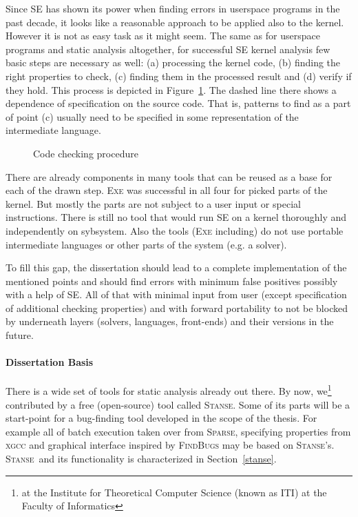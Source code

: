 \documentclass[11pt,a4paper]{article}
\newcommand{\stan}{\textsc{Stanse}}
\begin{document}
Since SE has shown its power when finding errors in userspace programs in the
past decade, it looks like a reasonable approach to be applied also to the
kernel. However it is not as easy task as it might seem. The same as for
userspace programs and static analysis altogether, for successful SE kernel
analysis few basic steps are necessary as well: (a) processing the kernel
code, (b) finding the right properties to check, (c) finding them in the
processed result and (d) verify if they hold. This process is depicted in
Figure~\ref{fig_code_process}. The dashed line there shows a dependence of
specification on the source code. That is, patterns to find as a part of
point (c) usually need to be specified in some representation of the
intermediate language.

\begin{figure}[htb]
\begin{center}

\caption{Code checking procedure}
\label{fig_code_process}
\end{center}
\end{figure}

There are already components in many tools that can be reused as a base for
each of the drawn step. \textsc{Exe} was successful in all four for picked
parts of the kernel. But mostly the parts are not subject to a user input or
special instructions. There is still no tool that would run SE on a kernel
thoroughly and independently on sybsystem. Also the tools (\textsc{Exe}
including) do not use portable intermediate languages or other parts of the
system (e.g. a solver).

To fill this gap, the dissertation should lead to a complete implementation
of the mentioned points and should find errors with minimum false positives
possibly with a help of SE. All of that with minimal input from user (except
specification of additional checking properties) and with forward portability
to not be blocked by underneath layers (solvers, languages, front-ends) and
their versions in the future.

\paragraph{Dissertation Basis} There is a wide set of tools for static
analysis already out there. By now, we\footnote{at the Institute for
Theoretical Computer Science (known as ITI) at the Faculty of Informatics}
contributed by a free (open-source) tool called \stan. Some of its parts will
be a start-point for a bug-finding tool developed in the scope of the thesis.
For example all of batch execution taken over from \textsc{Sparse}, specifying
properties from \textsc{xgcc} and graphical interface inspired by
\textsc{FindBugs} may be based on \stan's. \stan\ and its functionality
is characterized in Section~\ref{stanse}.
\end{document}
